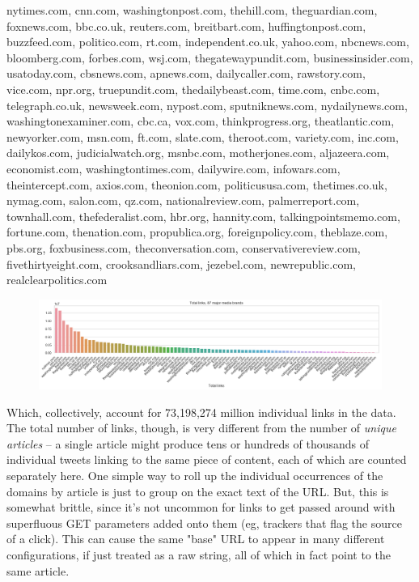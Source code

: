\documentclass{scrartcl}
\begin{document}
\begin{displayquote}
\scriptsize \raggedright nytimes.com, cnn.com, washingtonpost.com, thehill.com, theguardian.com, foxnews.com, bbc.co.uk, reuters.com, breitbart.com, huffingtonpost.com, buzzfeed.com, politico.com, rt.com, independent.co.uk, yahoo.com, nbcnews.com, bloomberg.com, forbes.com, wsj.com, thegatewaypundit.com, businessinsider.com, usatoday.com, cbsnews.com, apnews.com, dailycaller.com, rawstory.com, vice.com, npr.org, truepundit.com, thedailybeast.com, time.com, cnbc.com, telegraph.co.uk, newsweek.com, nypost.com, sputniknews.com, nydailynews.com, washingtonexaminer.com, cbc.ca, vox.com, thinkprogress.org, theatlantic.com, newyorker.com, msn.com, ft.com, slate.com, theroot.com, variety.com, inc.com, dailykos.com, judicialwatch.org, msnbc.com, motherjones.com, aljazeera.com, economist.com, washingtontimes.com, dailywire.com, infowars.com, theintercept.com, axios.com, theonion.com, politicususa.com, thetimes.co.uk, nymag.com, salon.com, qz.com, nationalreview.com, palmerreport.com, townhall.com, thefederalist.com, hbr.org, hannity.com, talkingpointsmemo.com, fortune.com, thenation.com, propublica.org, foreignpolicy.com, theblaze.com, pbs.org, foxbusiness.com, theconversation.com, conservativereview.com, fivethirtyeight.com, crooksandliars.com, jezebel.com, newrepublic.com, realclearpolitics.com
\end{displayquote}

\begin{figure}[H]
  \centering
  \includegraphics[width=\textwidth]{figures/t87-link-counts.png}
\end{figure}

Which, collectively, account for 73,198,274 million individual links in the data. The total number of links, though, is very different from the number of \textit{unique articles} -- a single article might produce tens or hundreds of thousands of individual tweets linking to the same piece of content, each of which are counted separately here. One simple way to roll up the individual occurrences of the domains by article is just to group on the exact text of the URL. But, this is somewhat brittle, since it's not uncommon for links to get passed around with superfluous GET parameters added onto them (eg, trackers that flag the source of a click). This can cause the same "base" URL to appear in many different configurations, if just treated as a raw string, all of which in fact point to the same article.
\end{document}
